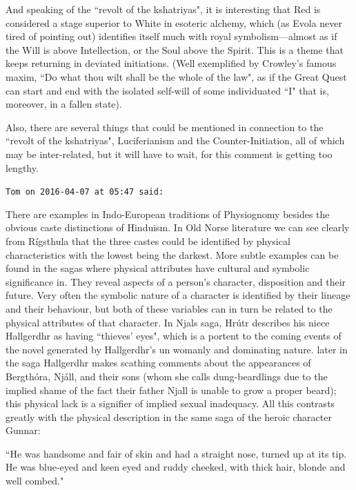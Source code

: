 \begin{footnotesize}
\begin{sffamily}
And speaking of the ``revolt of the kshatriyas", it is interesting that Red is considered a stage superior to White in esoteric alchemy, which (as Evola never tired of pointing out) identifies itself much with royal symbolism—almost as if the Will is above Intellection, or the Soul above the Spirit. This is a theme that keeps returning in deviated initiations. (Well exemplified by Crowley's famous maxim, ``Do what thou wilt shall be the whole of the law", as if the Great Quest can start and end with the isolated self-will of some individuated ``I" that is, moreover, in a fallen state).

Also, there are several things that could be mentioned in connection to the ``revolt of the kshatriyas", Luciferianism and the Counter-Initiation, all of which may be inter-related, but it will have to wait, for this comment is getting too lengthy.


\hfill

\texttt{Tom on 2016-04-07 at 05:47 said: }

There are examples in Indo-European traditions of Physiognomy besides the obvious caste distinctions of Hinduism. In Old Norse literature we can see clearly from Rígsthula that the three castes could be identified by physical characteristics with the lowest being the darkest. More subtle examples can be found in the sagas where physical attributes have cultural and symbolic significance in. They reveal aspects of a person's character, disposition and their future. Very often the symbolic nature of a character is identified by their lineage and their behaviour, but both of these variables can in turn be related to the physical attributes of that character. In Njals saga, Hrútr describes his niece Hallgerdhr as having ``thieves' eyes", which is a portent to the coming events of the novel generated by Hallgerdhr's un womanly and dominating nature. later in the saga Hallgerdhr makes scathing comments about the appearances of Bergthóra, Njáll, and their sons (whom she calls dung-beardlings due to the implied shame of the fact their father Njall is unable to grow a proper beard); this physical lack is a signifier of implied sexual inadequacy. All this contrasts greatly with the physical description in the same saga of the heroic character Gunnar:

``He was handsome and fair of skin and had a straight nose, turned up at its tip. He was blue-eyed and keen eyed and ruddy cheeked, with thick hair, blonde and well combed."


\hfill


\end{sffamily}
\end{footnotesize}
